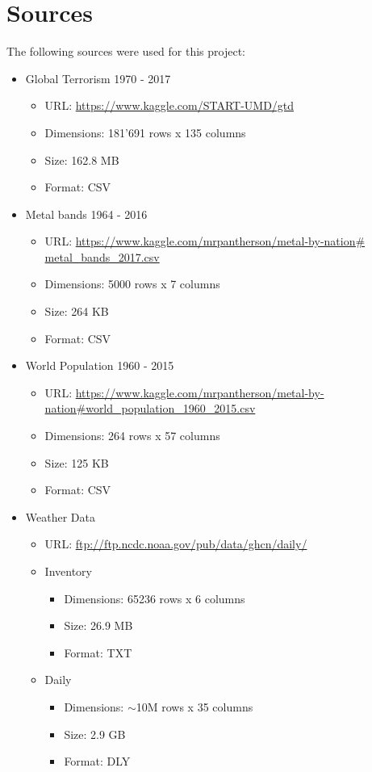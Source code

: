 \section{Sources}
The following sources were used for this project:
\begin{itemize}
	\item Global Terrorism 1970 - 2017
	\begin{itemize}
		\item URL: \url{https://www.kaggle.com/START-UMD/gtd}
		\item Dimensions: 181'691 rows x 135 columns
		\item Size: 162.8 MB
		\item Format: CSV
	\end{itemize}
	\item Metal bands 1964 - 2016
	\begin{itemize}
		\item URL: \url{https://www.kaggle.com/mrpantherson/metal-by-nation# metal_bands_2017.csv}
		\item Dimensions: 5000 rows x 7 columns
		\item Size: 264 KB
		\item Format: CSV
	\end{itemize}
	\item World Population 1960 - 2015
	\begin{itemize}
		\item URL: \url{https://www.kaggle.com/mrpantherson/metal-by-nation#world_population_1960_2015.csv}
		\item Dimensions: 264 rows x 57 columns
		\item Size: 125 KB
		\item Format: CSV
	\end{itemize}
	\item Weather Data
	\begin{itemize}
		\item URL: \url{ftp://ftp.ncdc.noaa.gov/pub/data/ghcn/daily/}
		\item Inventory
		\begin{itemize}
		  \item Dimensions: 65236 rows x 6 columns
		  \item Size: 26.9 MB
		  \item Format: TXT
	    \end{itemize}
		\item Daily
		\begin{itemize}
		  \item Dimensions: $\sim$10M rows x 35 columns
		  \item Size: 2.9 GB
		  \item Format: DLY
	    \end{itemize}
	\end{itemize}
\end{itemize}

